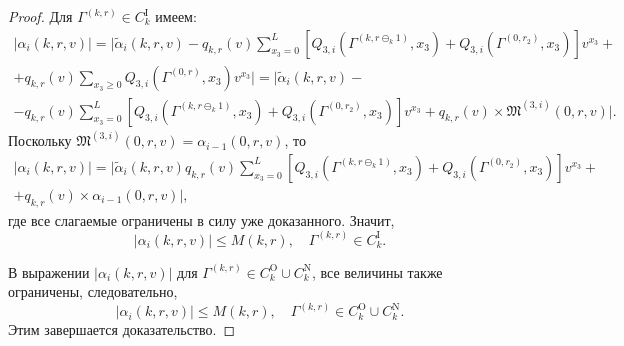 \documentclass[a4paper,12pt,russian]{extarticle}
\begin{document}
\begin{proof}
Для $\Gamma^{(k, r)} \in C_{k}^{\mathrm{I}}$ имеем:
\begin{multline*}
|\alpha_i(k,r,v) |=|\tilde{\alpha}_i(k,r,v) - q_{k,r}(v)\sum_{x_3=0}^{L} \left[ Q_{3,i}(\Gamma^{(k,r\ominus_k 1)},x_3) + Q_{3,i}(\Gamma^{(0,r_2)},x_3) \right] v^{x_3}+\\  +q_{{k},{r}}(v)  \sum_{x_3\geqslant 0} Q_{3,i}(\Gamma^{(0,{r})},x_3) v^{x_3}| = |\tilde{\alpha}_i(k,r,v)  -\\- q_{k,r}(v) \sum_{x_3=0}^{L} \left[ Q_{3,i}(\Gamma^{(k,r\ominus_k 1)},x_3) + Q_{3,i}(\Gamma^{(0,r_2)},x_3) \right] v^{x_3} + q_{{k},{r}}(v)\times \mathfrak{M}^{(3,i)}(0,r,v) |.
\end{multline*}
Поскольку $\mathfrak{M}^{(3,i)}(0,r,v) = \alpha_{i-1}(0,r,v)$, то 
\begin{multline*}
|\alpha_i(k,r,v) |= |\tilde{\alpha}_i(k,r,v)   q_{k,r}(v) \sum_{x_3=0}^{L} \left[ Q_{3,i}(\Gamma^{(k,r\ominus_k 1)},x_3) + Q_{3,i}(\Gamma^{(0,r_2)},x_3) \right] v^{x_3} + \\+q_{{k},{r}}(v)\times \alpha_{i-1}(0,r,v)|,
\end{multline*}
где все слагаемые ограничены в силу уже доказанного. Значит,
\begin{equation*}
|\alpha_i(k,r,v) |\leqslant M(k,r), \quad \Gamma^{(k, r)} \in C_{k}^{\mathrm{I}}.
\end{equation*}

В выражении $|\alpha_i(k,r,v)| $ для $\Gamma^{(k, r)} \in C_{k}^{\mathrm{O}} \cup C_{k}^{\mathrm{N}}$, все величины также ограничены, следовательно,
\begin{equation*}
|\alpha_i(k,r,v) |\leqslant M(k,r), \quad \Gamma^{(k, r)} \in C_{k}^{\mathrm{O}} \cup C_{k}^{\mathrm{N}}.
\end{equation*}
Этим завершается доказательство.

\end{proof}
\end{document}
